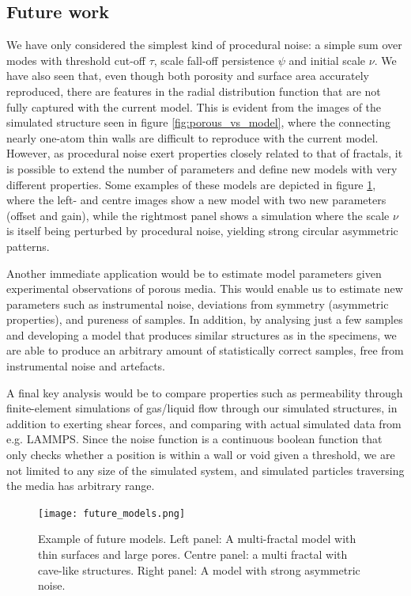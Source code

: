 \documentclass[aps,pre,twocolumn,letterpaper,floatfix,showpacs]{revtex4}
\begin{document}
\subsection{Future work}
We have only considered the simplest kind of procedural noise: a simple sum over modes with
threshold cut-off $\tau$, scale fall-off persistence $\psi$ and initial scale $\nu$. 
We have also seen that, even though both porosity and surface area accurately reproduced,
there are features in the radial distribution function that are not fully captured with the current model. 
This is evident from the images of the simulated structure seen in figure \ref{fig:porous_vs_model},
where the connecting nearly one-atom thin walls are difficult to reproduce with the current model. 
However, as procedural noise exert properties closely related to that of fractals, it is possible
to extend the number of parameters and define new models with very different properties. 
Some examples of these models are depicted in figure \ref{fig:future_models}, where the left- and
centre images show a new model with two new parameters (offset and gain), while the rightmost panel shows a simulation where the scale $\nu$ is itself being perturbed by procedural noise, yielding strong circular asymmetric patterns.

Another immediate application would be to estimate model parameters given experimental observations of porous media. 
This would enable us to estimate new parameters such as instrumental noise, deviations from symmetry
(asymmetric properties), and pureness of samples. 
In addition, by analysing just a few samples and developing a model that produces similar structures
as in the specimens, we are able to produce an arbitrary amount of statistically correct samples,
free from instrumental noise and artefacts. 

A final key analysis would be to compare properties such as permeability through finite-element
simulations of gas/liquid flow through our simulated structures, in addition to exerting shear forces,
and comparing with actual simulated data from e.g. LAMMPS. 
Since the noise function is a continuous boolean function that only checks whether a position is
within a wall or void given a threshold, we are not limited to any size of the simulated system, and simulated particles traversing the media has arbitrary range.  



\begin{figure}
\texttt{[image: future\_models.png]}
\caption{Example of future models. Left panel: A multi-fractal model with thin surfaces and large pores. Centre panel: a multi fractal with cave-like structures. Right panel: A model with strong asymmetric noise. }
\label{fig:future_models}
\end{figure}


\end{document}

